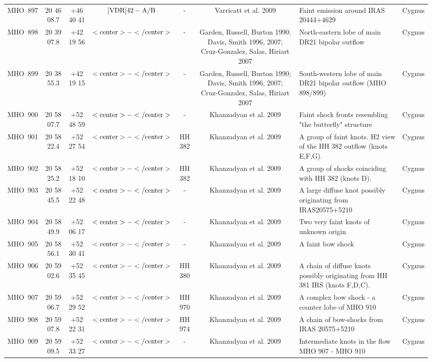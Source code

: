 \documentclass[12pt]{report}
\begin{document}
\begin{sidewaystable}
\begin{tabular}{@{}lccccclc}
MHO~897 & 20 46 08.7 & +46 40 41 & ${\rm [VDR] 42-A/B}$ & - & Varricatt et al. 2009 & Faint emission around IRAS 20444+4629 & Cygnus \\ 
MHO~898 & 20 39 07.8 & +42 19 56 & ${\rm <center>-</center>}$ & - & Garden, Russell, Burton 1990; Davis, Smith 1996, 2007; Cruz-Gonzalez, Salas, Hiriart 2007 & North-eastern lobe of main DR21 bipolar outflow  & Cygnus \\ 
MHO~899 & 20 38 55.3 & +42 19 15 & ${\rm <center>-</center>}$ & - & Garden, Russell, Burton 1990; Davis, Smith 1996, 2007; Cruz-Gonzalez, Salas, Hiriart 2007 & South-western lobe of main DR21 bipolar outflow (MHO 898/899) & Cygnus \\ 
MHO~900 & 20 58 07.7 & +52 48 59 & ${\rm <center>-</center>}$ & - & Khanzadyan et al. 2009 & Faint shock fronts resembling "the butterfly" structure & Cygnus \\ 
MHO~901 & 20 58 22.4 & +52 27 54 & ${\rm <center>-</center>}$ & HH 382 & Khanzadyan et al. 2009 & A group of faint knots. H2 view of the HH 382 outflow (knots E,F,G). & Cygnus \\ 
MHO~902 & 20 58 25.2 & +52 18 10 & ${\rm <center>-</center>}$ & HH 382 & Khanzadyan et al. 2009 & A group of shocks coinciding with HH 382 (knots D). & Cygnus \\ 
MHO~903 & 20 58 45.5 & +52 22 48 & ${\rm <center>-</center>}$ & - & Khanzadyan et al. 2009 & A large diffuse knot possibly originating from IRAS20575+5210 & Cygnus \\ 
MHO~904 & 20 58 49.9 & +52 06 17 & ${\rm <center>-</center>}$ & - & Khanzadyan et al. 2009 & Two very faint knots of unknown origin & Cygnus \\ 
MHO~905 & 20 58 56.1 & +52 30 41 & ${\rm <center>-</center>}$ & - & Khanzadyan et al. 2009 & A faint bow shock & Cygnus \\ 
MHO~906 & 20 59 02.6 & +52 35 45 & ${\rm <center>-</center>}$ & HH 380 & Khanzadyan et al. 2009 & A chain of diffuse knots possibly originating from HH 381 IRS (knots F,D,C). & Cygnus \\ 
MHO~907 & 20 59 06.7 & +52 29 52 & ${\rm <center>-</center>}$ & HH 970 & Khanzadyan et al. 2009 & A complex bow shock - a counter lobe of MHO 910 & Cygnus \\ 
MHO~908 & 20 59 07.8 & +52 22 31 & ${\rm <center>-</center>}$ & HH 974 & Khanzadyan et al. 2009 & A chain of bow-shocks from IRAS 20575+5210 & Cygnus \\ 
MHO~909 & 20 59 09.5 & +52 33 27 & ${\rm <center>-</center>}$ & - & Khanzadyan et al. 2009 & Intermediate knots in the flow MHO 907 - MHO 910 & Cygnus \\ 

\end{tabular}
\end{sidewaystable}
\end{document}
